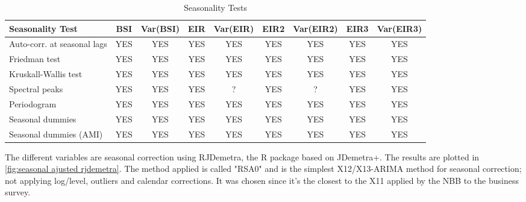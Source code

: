 \documentclass[12pt,a4paper,oneside]{book}
\begin{document}
\begin{table}[htp!]
    \caption{Seasonality Tests}
    \label{tab:Seasonality Tests}
    \centering \footnotesize
    \begin{tabular}{l|c|c|c|c|c|c|c|c}
\textbf{Seasonality Test} & BSI & Var(BSI) & EIR & Var(EIR) & EIR2 & Var(EIR2) & EIR3 & Var(EIR3) \\ \hline
Auto-corr. at seasonal lags& YES & YES & YES & YES & YES & YES & YES & YES \\
Friedman test       & YES   & YES & YES & YES & YES & YES & YES & YES \\
Kruskall-Wallis test & YES   & YES & YES & YES & YES & YES & YES & YES \\
Spectral peaks                  & YES   & YES & YES & ? & YES & ? & YES & YES \\
Periodogram                     & YES   & YES & YES & YES & YES & YES & YES & YES \\
Seasonal dummies                & YES   & YES & YES & YES & YES & YES & YES & YES \\
Seasonal dummies (AMI)          & YES   & YES & YES & YES & YES & YES & YES & YES \\
    \end{tabular}
\end{table}



The different variables are seasonal correction using RJDemetra, the R package based on JDemetra+.
The results are plotted in \autoref{fig:seasonal ajusted rjdemetra}.
The method applied is called "RSA0" and is the simplest X12/X13-ARIMA method for seasonal correction; not applying log/level, outliers and calendar corrections.
It was chosen since it's the closest to the X11 applied by the NBB to the business survey.

\end{document}
